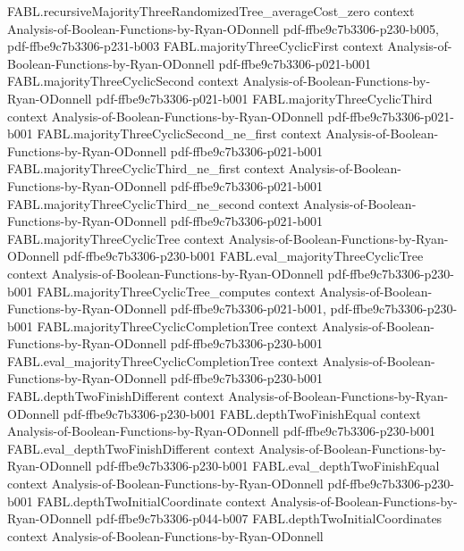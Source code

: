 \begin{theorem}
\proofstep
  {FABL.recursiveMajorityThreeRandomizedTree_averageCost_zero}
  {context}
  {Analysis-of-Boolean-Functions-by-Ryan-ODonnell}
  {pdf-ffbe9c7b3306-p230-b005,
    pdf-ffbe9c7b3306-p231-b003}
\proofstep
  {FABL.majorityThreeCyclicFirst}
  {context}
  {Analysis-of-Boolean-Functions-by-Ryan-ODonnell}
  {pdf-ffbe9c7b3306-p021-b001}
\proofstep
  {FABL.majorityThreeCyclicSecond}
  {context}
  {Analysis-of-Boolean-Functions-by-Ryan-ODonnell}
  {pdf-ffbe9c7b3306-p021-b001}
\proofstep
  {FABL.majorityThreeCyclicThird}
  {context}
  {Analysis-of-Boolean-Functions-by-Ryan-ODonnell}
  {pdf-ffbe9c7b3306-p021-b001}
\proofstep
  {FABL.majorityThreeCyclicSecond_ne_first}
  {context}
  {Analysis-of-Boolean-Functions-by-Ryan-ODonnell}
  {pdf-ffbe9c7b3306-p021-b001}
\proofstep
  {FABL.majorityThreeCyclicThird_ne_first}
  {context}
  {Analysis-of-Boolean-Functions-by-Ryan-ODonnell}
  {pdf-ffbe9c7b3306-p021-b001}
\proofstep
  {FABL.majorityThreeCyclicThird_ne_second}
  {context}
  {Analysis-of-Boolean-Functions-by-Ryan-ODonnell}
  {pdf-ffbe9c7b3306-p021-b001}
\proofstep
  {FABL.majorityThreeCyclicTree}
  {context}
  {Analysis-of-Boolean-Functions-by-Ryan-ODonnell}
  {pdf-ffbe9c7b3306-p230-b001}
\proofstep
  {FABL.eval_majorityThreeCyclicTree}
  {context}
  {Analysis-of-Boolean-Functions-by-Ryan-ODonnell}
  {pdf-ffbe9c7b3306-p230-b001}
\proofstep
  {FABL.majorityThreeCyclicTree_computes}
  {context}
  {Analysis-of-Boolean-Functions-by-Ryan-ODonnell}
  {pdf-ffbe9c7b3306-p021-b001,
    pdf-ffbe9c7b3306-p230-b001}
\proofstep
  {FABL.majorityThreeCyclicCompletionTree}
  {context}
  {Analysis-of-Boolean-Functions-by-Ryan-ODonnell}
  {pdf-ffbe9c7b3306-p230-b001}
\proofstep
  {FABL.eval_majorityThreeCyclicCompletionTree}
  {context}
  {Analysis-of-Boolean-Functions-by-Ryan-ODonnell}
  {pdf-ffbe9c7b3306-p230-b001}
\proofstep
  {FABL.depthTwoFinishDifferent}
  {context}
  {Analysis-of-Boolean-Functions-by-Ryan-ODonnell}
  {pdf-ffbe9c7b3306-p230-b001}
\proofstep
  {FABL.depthTwoFinishEqual}
  {context}
  {Analysis-of-Boolean-Functions-by-Ryan-ODonnell}
  {pdf-ffbe9c7b3306-p230-b001}
\proofstep
  {FABL.eval_depthTwoFinishDifferent}
  {context}
  {Analysis-of-Boolean-Functions-by-Ryan-ODonnell}
  {pdf-ffbe9c7b3306-p230-b001}
\proofstep
  {FABL.eval_depthTwoFinishEqual}
  {context}
  {Analysis-of-Boolean-Functions-by-Ryan-ODonnell}
  {pdf-ffbe9c7b3306-p230-b001}
\proofstep
  {FABL.depthTwoInitialCoordinate}
  {context}
  {Analysis-of-Boolean-Functions-by-Ryan-ODonnell}
  {pdf-ffbe9c7b3306-p044-b007}
\proofstep
  {FABL.depthTwoInitialCoordinates}
  {context}
  {Analysis-of-Boolean-Functions-by-Ryan-ODonnell}

\end{theorem}
